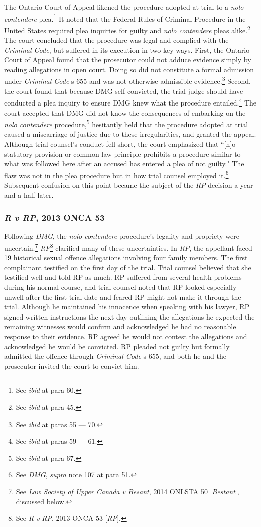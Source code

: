 The Ontario Court of Appeal likened the procedure adopted at trial to a \textit{nolo contendere} plea.\footnote{See \textit{ibid} at para 60.} It noted that the Federal Rules of Criminal Procedure in the United States required plea inquiries for guilty and \textit{nolo contendere} pleas alike.\footnote{See \textit{ibid} at para 45.} The court concluded that the procedure was legal and complied with the \textit{Criminal Code}, but suffered in its execution in two key ways. First, the Ontario Court of Appeal found that the prosecutor could not adduce evidence simply by reading allegations in open court. Doing so did not constitute a formal admission under \textit{Criminal Code} s 655 and was not otherwise admissible evidence.\footnote{See \textit{ibid} at paras 55 — 70.} Second, the court found that because DMG self-convicted, the trial judge should have conducted a plea inquiry to ensure DMG knew what the procedure entailed.\footnote{See \textit{ibid} at paras 59 — 61.} The court accepted that DMG did not know the consequences of embarking on the \textit{nolo contendere} procedure,\footnote{See \textit{ibid} at para 67.} hesitantly held that the procedure adopted at trial caused a miscarriage of justice due to these irregularities, and granted the appeal. Although trial counsel's conduct fell short, the court emphasized that ``[n]o statutory provision or common law principle prohibits a procedure similar to what was followed here after an accused has entered a plea of not guilty." The flaw was not in the plea procedure but in how trial counsel employed it.\footnote{See \textit{DMG}, \textit{supra} note 107 at para 51.} Subsequent confusion on this point became the subject of the \textit{RP} decision a year and a half later.

\subsubsection{\textit{R v RP}, 2013 ONCA 53}

Following \textit{DMG}, the \textit{nolo contendere} procedure's legality and propriety were uncertain.\footnote{See \textit{Law Society of Upper Canada v Besant}, 2014 ONLSTA 50 [\textit{Bestant}], discussed below.} \textit{RP}\footnote{See \textit{R v RP}, 2013 ONCA 53 [\textit{RP}].} clarified many of these uncertainties. In \textit{RP}, the appellant faced 19 historical sexual offence allegations involving four family members. The first complainant testified on the first day of the trial. Trial counsel believed that she testified well and told RP as much. RP suffered from several health problems during his normal course, and trial counsel noted that RP looked especially unwell after the first trial date and feared RP might not make it through the trial. Although he maintained his innocence when speaking with his lawyer, RP signed written instructions the next day outlining the allegations he expected the remaining witnesses would confirm and acknowledged he had no reasonable response to their evidence. RP agreed he would not contest the allegations and acknowledged he would be convicted. RP pleaded not guilty but formally admitted the offence through \textit{Criminal Code} s 655, and both he and the prosecutor invited the court to convict him.

